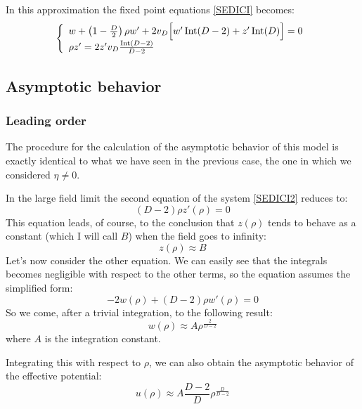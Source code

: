 In this approximation the fixed point equations \eqref{SEDICI} becomes:
\begin{equation}\label{SEDICI2}
\left\{
\begin{array}{l}
w + \left(1 - \frac{D}{2}\right){\rho} w' + 2v_D \Big[w'\operatorname{Int}(D-2) + z'\operatorname{Int}(D) \Big] = 0\\
\rho z'  = 2z' v_D\frac{\operatorname{Int}(D -2)}{D - 2}\\
\end{array} 
\right.
\end{equation}

\subsection{Asymptotic behavior}
\subsubsection{Leading order}
The procedure for the calculation of the asymptotic behavior of this model is exactly identical to what we have seen in the previous case, the one in which  we considered $\eta \neq 0$.

In the large field limit the second equation of the system \eqref{SEDICI2} reduces to:
\begin{equation}
 (D-2){\rho}{z'({\rho})} = 0
\end{equation}
This equation leads, of course, to the conclusion that $z(\rho)$ tends to behave as a constant (which I will call $B$) when the field goes to infinity:
\begin{equation}\label{zB}
 z({\rho}) \approx B
\end{equation}
Let's now consider the other equation. We can easily see that the integrals becomes 
negligible with respect to the other terms, so the equation assumes the simplified form:
\begin{equation}
-2w({\rho}) + (D-2){\rho} w'({\rho})=0
\end{equation}
So we come, after a trivial integration, to the following result:
\begin{equation}\label{wAr2}
w({\rho}) \approx A{\rho}^\frac{2}{D - 2}
\end{equation}
where $A$ is the integration constant. 

Integrating this with respect to $\rho$, we can also obtain the asymptotic behavior of the effective potential:
\begin{equation}
u({\rho}) \approx A\frac{D-2}{D}{\rho}^\frac{D}{D - 2}
\end{equation}


